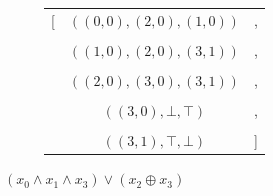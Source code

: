 \documentclass[english, aspectratio=169]{beamer}
\newcommand{\triple}[3]{\ensuremath{(#1, #2, #3)}}
\begin{document}
\begin{frame}
  \begin{figure}
    \centering

    \begin{subfigure}{0.49\linewidth}
      \centering

      \begin{subfigure}[b]{0.33\linewidth}
        \centering

        \begin{tikzpicture}[scale=0.6, every node/.style={transform shape}]
          
        \end{tikzpicture}
      \end{subfigure}
      \begin{subfigure}[b]{0.55\linewidth}
        \centering
        { \tiny
          \begin{tabular}{r c l}
            [ & $\triple{(0,0)}{(2,0)}{(1,0)}$ & ,
            \\ \\
              & $\triple{(1,0)}{(2,0)}{(3,1)}$ & ,
            \\ \\
              & $\triple{(2,0)}{(3,0)}{(3,1)}$ & ,
            \\ \\
              & $\triple{(3,0)}{\bot}{\top}$   & ,
            \\ \\
              & $\triple{(3,1)}{\top}{\bot}$   & ]
          \end{tabular}
          \vspace{6pt}
        }
      \end{subfigure}

      \caption{$(x_0 \wedge x_1 \wedge x_3) \vee (x_2 \oplus x_3)$}
    \end{subfigure}
    \begin{subfigure}{0.49\linewidth}
      \centering


\end{subfigure}
\end{figure}
\end{frame}
\end{document}
